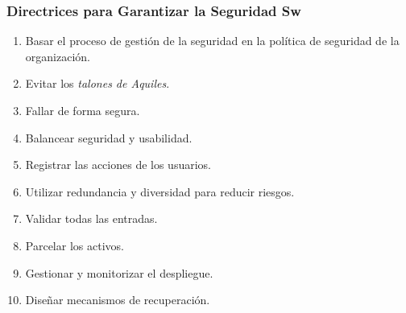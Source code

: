 \documentclass[a4paper,slidestop,xcolor=pst,dvips,blue]{beamer}
\begin{document}
\begin{frame}[c]
    \frametitle{Directrices para Garantizar la Seguridad Sw}
    \begin{enumerate}[<+->]
        \item Basar el proceso de gestión de la seguridad en la política de seguridad de la organización.
        \item Evitar los \emph{talones de Aquiles}.
        \item Fallar de forma segura.
        \item Balancear seguridad y usabilidad.
        \item Registrar las acciones de los usuarios.
        \item Utilizar redundancia y diversidad para reducir riesgos.
        \item Validar todas las entradas.
        \item Parcelar los activos.
        \item Gestionar y monitorizar el despliegue.
        \item Diseñar mecanismos de recuperación.
    \end{enumerate}
\end{frame}

\end{document}
